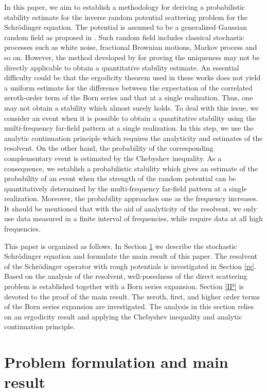 \documentclass[reqno, 12pt]{amsart}
\numberwithin{equation}{section}
\begin{document}
In this paper, we aim to establish a methodology for deriving a probabilistic stability estimate for the inverse random potential scattering problem for the Schr\"odinger equation. The potential is assumed to be a generalized Gaussian random field as proposed in \cite{LPS}. Such random field includes classical stochastic processes such as white noise, fractional Brownian motions, Markov process and so on.  However, the method developed by \cite{Caro, LPS} for proving the uniqueness may not be directly applicable to obtain a quantitative 
stability estimate. An essential difficulty could be that the ergodicity theorem used in these works does not yield a uniform estimate for the difference between the expectation of the correlated zeroth-order
term of the Born series and that at a single realization. Thus, one may not obtain a stability which almost surely holds.
To deal with this issue, we consider an event when it is possible to obtain a quantitative stability using the multi-frequency far-field pattern at a single realization. In this step, we use the analytic
continuation principle which requires the analyticity and estimates of the resolvent.
On the other hand, the probability of the corresponding complementary event  is estimated by the Chebyshev inequality.
As a consequence, we establish a probabilistic stability which gives an estimate of the probability of an event when the strength of the random potential 
can be quantitatively determined by the multi-frequency far-field pattern at a single realization. Moreover, the probability approaches one as the frequency increases.
It should be mentioned that with the aid of analyticity of the resolvent, we only use data measured in a finite interval of frequencies, while \cite{Caro, LPS} require data at all high frequencies. 


This paper is organized as follows. In Section \ref{sec2} we describe the stochastic Schr\"odinger equation and formulate the main result of this paper.
The resolvent of the Schr\"odinger operator with rough potentials is investigated in Section \ref{re}. Based on the analysis of the resolvent, well-posedness of the direct
scattering problem is established together with a Born series expansion. Section \ref{IP} is devoted to the proof of the main result. 
The zeroth, first, and higher order terms of the Born series expansion are investigated. 
The analysis in this section relies on an ergodicity result and applying the Chebyshev inequality and analytic continuation principle.

\section{Problem formulation and main result}\label{sec2}
\end{document}
